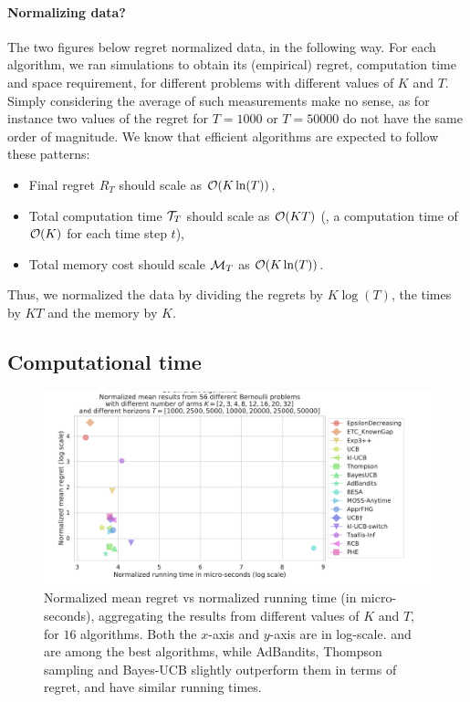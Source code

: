 \paragraph{Normalizing data?}

The two figures below regret normalized data, in the following way.
For each algorithm, we ran simulations to obtain its (empirical) regret, computation time and space requirement, for different problems with different values of $K$ and $T$.
Simply considering the average of such measurements make no sense, as for instance two values of the regret for $T=1000$ or $T=50000$ do not have the same order of magnitude.
%
We know that efficient algorithms are expected to follow these patterns:
\begin{itemize}
    \item Final regret $R_T$ should scale as $\mathcal{O}(K \ln(T))$,
    \item Total computation time $\mathcal{T}_T$ should scale as $\mathcal{O}(K T)$ (\ie, a computation time of $\mathcal{O}(K)$ for each time step $t$),
    \item Total memory cost should scale $\mathcal{M}_T$ as $\mathcal{O}(K \ln(T))$.
\end{itemize}
Thus, we normalized the data by dividing the regrets by $K \log(T)$, the times by $K T$ and the memory by $K$.


\subsection{Computational time}


\begin{figure}[h!]  %
	\includegraphics[width=1.10\linewidth]{16_different_algorithms__lognormregret_vs_lognormtime__56pb__7KS_7Ts.pdf}
	\caption[Normalized mean regret vs normalized running time (in micro-seconds).]{
        Normalized mean regret vs normalized running time (in micro-seconds),
        aggregating the results from different values of $K$ and $T$, for $16$ algorithms.
        Both the $x$-axis and $y$-axis are in log-scale.
        \UCB{} and \klUCB{} are among the best algorithms, while AdBandits, Thompson sampling and Bayes-UCB slightly outperform them in terms of regret, and have similar running times.
	}
	\label{fig:3:16_different_algorithms__lognormregret_vs_lognormtime__56pb__7KS_7Ts}
\end{figure}


